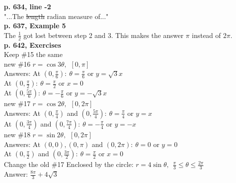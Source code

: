\documentclass[11pt]{report}
\newlength\tindent
\renewcommand{\indent}{\hspace*{\tindent}}
\begin{document}
\textbf{p. 634, line -2}\\
"...The \sout{length} radian measure of..."\\

\textbf{p. 637, Example 5}\\
The $\frac{1}{2}$ got lost between step 2 and 3. This makes the answer $\pi$ instead of $2\pi$.\\

\textbf{p. 642, Exercises}\\

Keep \#15 the same\\

new \#16 $r=\cos 3\theta, ~~[0,\pi]$\\
Answers: At $(0,\frac{\pi}{6}):~ \theta = \frac{\pi}{6}$ or $y=\sqrt 3 x$\\
\indent At $(0,\frac{\pi}{2}):~ \theta = \frac{\pi}{2}$ or $x=0$\\
\indent At $(0,\frac{5\pi}{6}):~ \theta = -\frac{\pi}{6}$ or $y=-\sqrt 3 x$\\

new \#17 $r=\cos 2\theta,~~[0,2\pi]$\\
Answers: At $(0,\frac{\pi}{4})$ and $(0,\frac{5\pi}{4}):~ \theta = \frac{\pi}{4}$ or $y= x$\\
\indent At $(0,\frac{3\pi}{4})$ and $(0,\frac{7\pi}{4}):~ \theta = -\frac{\pi}{4}$ or $y= -x$\\

new \#18 $r=\sin 2\theta,~~[0,2\pi]$\\
Answers: At $(0,0), (0,\pi)$ and $(0,2\pi):~ \theta = 0$ or $y= 0$\\
\indent At $(0,\frac{\pi}{2})$ and $(0,\frac{3\pi}{2}):~ \theta = \frac{\pi}{2}$ or $x=0$\\

Change the old \#17 Enclosed by the circle: $r=4\sin \theta,~~\frac{\pi}{3} \leq \theta \leq \frac{2\pi}{3}$\\
Answer: $\frac{8\pi}{3}+4\sqrt 3$
\end{document}
